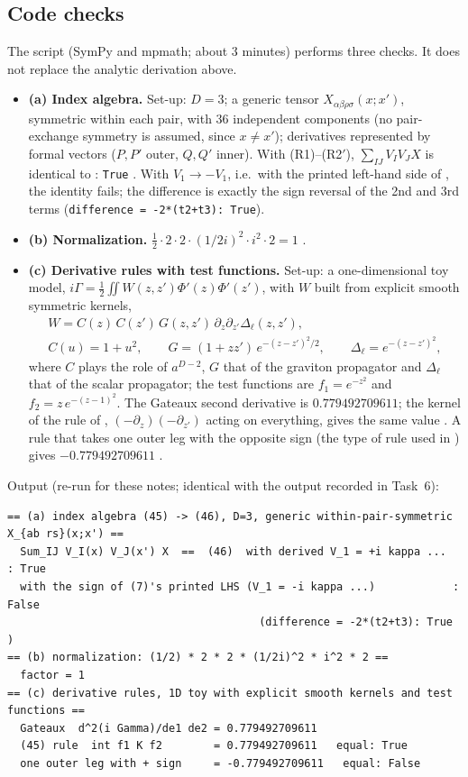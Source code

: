 \subsection{Code checks \tC}
\label{sec:ch3-t6-code}

The script  (SymPy and mpmath; about 3 minutes) performs three checks. It does not replace the analytic derivation above.
\begin{itemize}[leftmargin=14pt]
\item \textbf{(a) Index algebra.}
Set-up: $D=3$; a generic tensor $X_{\alpha\beta\rho\sigma}(x;x')$, symmetric within each pair, with 36 independent components
(no pair-exchange symmetry is assumed, since $x\ne x'$); derivatives represented by formal vectors ($P,P'$ outer, $Q,Q'$ inner).
With (R1)--(R2$'$), $\sum_{IJ}V_IV_JX$ is identical to : \texttt{True} \chIIIok.
With $V_1\to-V_1$, i.e.\ with the printed left-hand side of , the identity fails; the difference is exactly the sign reversal of the
2nd and 3rd terms (\texttt{difference = -2*(t2+t3): True}).
\item \textbf{(b) Normalization.} $\tfrac12\cdot2\cdot2\cdot(1/2i)^2\cdot i^2\cdot2=1$ \chIIIok.
\item \textbf{(c) Derivative rules with test functions.}
Set-up: a one-dimensional toy model, $i\Gamma=\tfrac12\iint W(z,z')\Phi'(z)\Phi'(z')$, with $W$ built from explicit smooth symmetric kernels,
\begin{equation*}
\begin{gathered}
W=C(z)\,C(z')\,G(z,z')\,\partial_z\partial_{z'}\Delta_\ell(z,z'),\\
C(u)=1+u^2,\qquad G=(1+zz')\,e^{-(z-z')^2/2},\qquad \Delta_\ell=e^{-(z-z')^2},
\end{gathered}
\end{equation*}
where $C$ plays the role of $a^{D-2}$, $G$ that of the graviton propagator and $\Delta_\ell$ that of the scalar propagator; the test functions are
$f_1=e^{-z^2}$ and $f_2=z\,e^{-(z-1)^2}$.
The Gateaux second derivative is $0.779492709611$; the kernel of the rule of , $(-\partial_z)(-\partial_{z'})$ acting on everything, gives the
same value \chIIIok. A rule that takes one outer leg with the opposite sign (the type of rule used in ) gives $-0.779492709611$ \chIIIno.
\end{itemize}
Output (re-run for these notes; identical with the output recorded in Task~6):
{\footnotesize
\begin{verbatim}
== (a) index algebra (45) -> (46), D=3, generic within-pair-symmetric X_{ab rs}(x;x') ==
  Sum_IJ V_I(x) V_J(x') X  ==  (46)  with derived V_1 = +i kappa ...  : True
  with the sign of (7)'s printed LHS (V_1 = -i kappa ...)            : False
                                       (difference = -2*(t2+t3): True )
== (b) normalization: (1/2) * 2 * 2 * (1/2i)^2 * i^2 * 2 ==
  factor = 1
== (c) derivative rules, 1D toy with explicit smooth kernels and test functions ==
  Gateaux  d^2(i Gamma)/de1 de2 = 0.779492709611
  (45) rule  int f1 K f2        = 0.779492709611   equal: True
  one outer leg with + sign     = -0.779492709611   equal: False
\end{verbatim}
}
